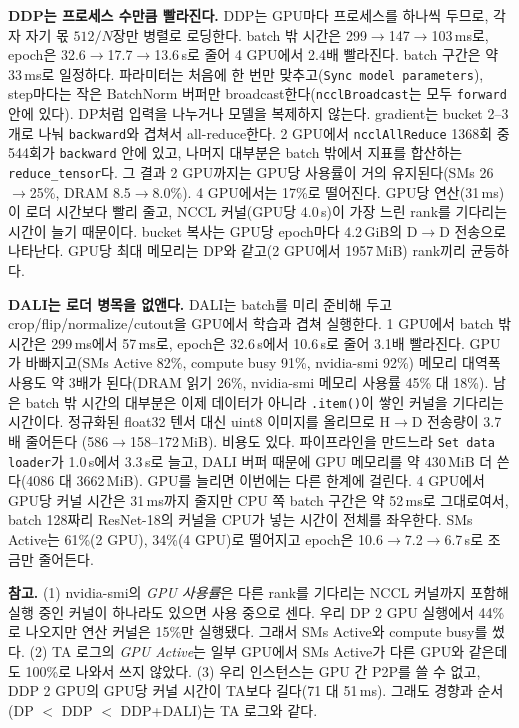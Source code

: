 \documentclass[11pt,a4paper]{article}
\begin{document}
\textbf{DDP는 프로세스 수만큼 빨라진다.} DDP는 GPU마다 프로세스를 하나씩 두므로, 각자 자기 몫 $512/N$장만 병렬로 로딩한다. batch 밖 시간은
299$\rightarrow$147$\rightarrow$103\,ms로, epoch은 32.6$\rightarrow$17.7$\rightarrow$13.6\,s로 줄어 4 GPU에서 2.4배 빨라진다. batch 구간은 약 33\,ms로 일정하다.
파라미터는 처음에 한 번만 맞추고(\texttt{Sync model parameters}), step마다는 작은 BatchNorm 버퍼만 broadcast한다(\texttt{ncclBroadcast}는 모두
\texttt{forward} 안에 있다). DP처럼 입력을 나누거나 모델을 복제하지 않는다. gradient는 bucket 2--3개로 나눠 \texttt{backward}와 겹쳐서 all-reduce한다.
2 GPU에서 \texttt{ncclAllReduce} 1368회 중 544회가 \texttt{backward} 안에 있고, 나머지 대부분은 batch 밖에서 지표를 합산하는 \texttt{reduce\_tensor}다.
그 결과 2 GPU까지는 GPU당 사용률이 거의 유지된다(SMs 26$\rightarrow$25\%, DRAM 8.5$\rightarrow$8.0\%). 4 GPU에서는 17\%로 떨어진다. GPU당 연산(31\,ms)이
로더 시간보다 빨리 줄고, NCCL 커널(GPU당 4.0\,s)이 가장 느린 rank를 기다리는 시간이 늘기 때문이다. bucket 복사는 GPU당 epoch마다 4.2\,GiB의 D$\to$D
전송으로 나타난다. GPU당 최대 메모리는 DP와 같고(2 GPU에서 1957\,MiB) rank끼리 균등하다.

\textbf{DALI는 로더 병목을 없앤다.} DALI는 batch를 미리 준비해 두고 crop/flip/normalize/cutout을 GPU에서 학습과 겹쳐 실행한다. 1 GPU에서 batch 밖
시간은 299\,ms에서 57\,ms로, epoch은 32.6\,s에서 10.6\,s로 줄어 3.1배 빨라진다. GPU가 바빠지고(SMs Active 82\%, compute busy 91\%, nvidia-smi 92\%)
메모리 대역폭 사용도 약 3배가 된다(DRAM 읽기 26\%, nvidia-smi 메모리 사용률 45\% 대 18\%). 남은 batch 밖 시간의 대부분은 이제 데이터가 아니라
\texttt{.item()}이 쌓인 커널을 기다리는 시간이다. 정규화된 float32 텐서 대신 uint8 이미지를 올리므로 H$\to$D 전송량이 3.7배 줄어든다
(586$\rightarrow$158--172\,MiB). 비용도 있다. 파이프라인을 만드느라 \texttt{Set data loader}가 1.0\,s에서 3.3\,s로 늘고, DALI 버퍼 때문에 GPU 메모리를
약 430\,MiB 더 쓴다(4086 대 3662\,MiB). GPU를 늘리면 이번에는 다른 한계에 걸린다. 4 GPU에서 GPU당 커널 시간은 31\,ms까지 줄지만 CPU 쪽 batch
구간은 약 52\,ms로 그대로여서, batch 128짜리 ResNet-18의 커널을 CPU가 넣는 시간이 전체를 좌우한다. SMs Active는 61\%(2 GPU), 34\%(4 GPU)로 떨어지고
epoch은 10.6$\rightarrow$7.2$\rightarrow$6.7\,s로 조금만 줄어든다.

\textbf{참고.} (1) nvidia-smi의 \emph{GPU 사용률}은 다른 rank를 기다리는 NCCL 커널까지 포함해 실행 중인 커널이 하나라도 있으면 사용 중으로 센다.
우리 DP 2 GPU 실행에서 44\%로 나오지만 연산 커널은 15\%만 실행됐다. 그래서 SMs Active와 compute busy를 썼다. (2) TA 로그의 \emph{GPU Active}는
일부 GPU에서 SMs Active가 다른 GPU와 같은데도 100\%로 나와서 쓰지 않았다. (3) 우리 인스턴스는 GPU 간 P2P를 쓸 수 없고, DDP 2 GPU의 GPU당 커널
시간이 TA보다 길다(71 대 51\,ms). 그래도 경향과 순서(DP $<$ DDP $<$ DDP+DALI)는 TA 로그와 같다.
\end{document}
